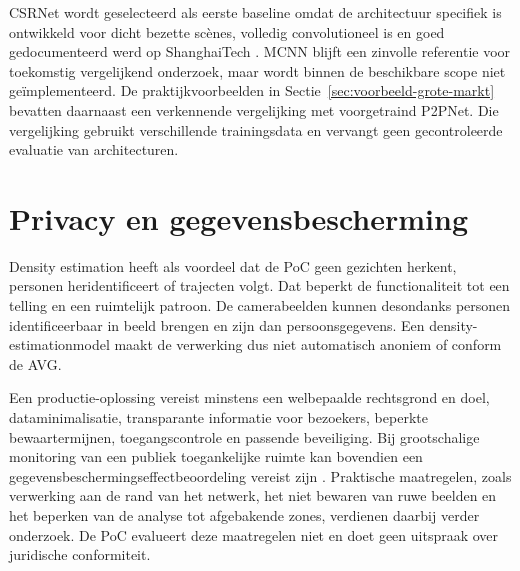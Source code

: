 CSRNet wordt geselecteerd als eerste baseline omdat de architectuur specifiek is ontwikkeld voor dicht bezette scènes, volledig convolutioneel is en goed gedocumenteerd werd op ShanghaiTech \autocite{Li2018}. MCNN blijft een zinvolle referentie voor toekomstig vergelijkend onderzoek, maar wordt binnen de beschikbare scope niet geïmplementeerd. De praktijkvoorbeelden in Sectie~\ref{sec:voorbeeld-grote-markt} bevatten daarnaast een verkennende vergelijking met voorgetraind P2PNet. Die vergelijking gebruikt verschillende trainingsdata en vervangt geen gecontroleerde evaluatie van architecturen.

\section{Privacy en gegevensbescherming}

Density estimation heeft als voordeel dat de PoC geen gezichten herkent, personen heridentificeert of trajecten volgt. Dat beperkt de functionaliteit tot een telling en een ruimtelijk patroon. De camerabeelden kunnen desondanks personen identificeerbaar in beeld brengen en zijn dan persoonsgegevens. Een density-estimationmodel maakt de verwerking dus niet automatisch anoniem of conform de AVG.

Een productie-oplossing vereist minstens een welbepaalde rechtsgrond en doel, dataminimalisatie, transparante informatie voor bezoekers, beperkte bewaartermijnen, toegangscontrole en passende beveiliging. Bij grootschalige monitoring van een publiek toegankelijke ruimte kan bovendien een gegevensbeschermingseffectbeoordeling vereist zijn \autocite{EDPBVideo2020}. Praktische maatregelen, zoals verwerking aan de rand van het netwerk, het niet bewaren van ruwe beelden en het beperken van de analyse tot afgebakende zones, verdienen daarbij verder onderzoek. De PoC evalueert deze maatregelen niet en doet geen uitspraak over juridische conformiteit.
